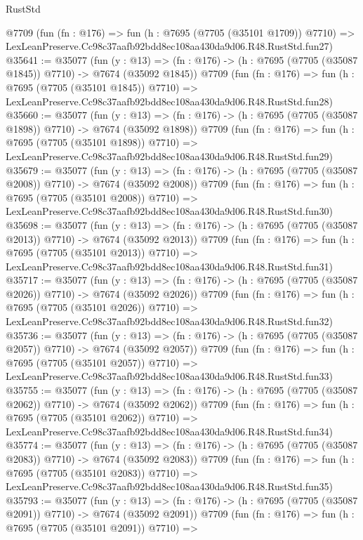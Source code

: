 \begin{lexlean}{RustStd}
\begin{coremodule}
    @7709
    (fun (fn : @176) =>
    fun (h : @7695 (@7705 (@35101 @1709)) @7710) =>
    LexLeanPreserve.Cc98c37aafb92bdd8ec108aa430da9d06.R48.RustStd.fun27)
@35641 := @35077
    (fun (y : @13) =>
    (fn : @176) -> (h : @7695 (@7705 (@35087 @1845)) @7710) -> @7674 (@35092 @1845))
    @7709
    (fun (fn : @176) =>
    fun (h : @7695 (@7705 (@35101 @1845)) @7710) =>
    LexLeanPreserve.Cc98c37aafb92bdd8ec108aa430da9d06.R48.RustStd.fun28)
@35660 := @35077
    (fun (y : @13) =>
    (fn : @176) -> (h : @7695 (@7705 (@35087 @1898)) @7710) -> @7674 (@35092 @1898))
    @7709
    (fun (fn : @176) =>
    fun (h : @7695 (@7705 (@35101 @1898)) @7710) =>
    LexLeanPreserve.Cc98c37aafb92bdd8ec108aa430da9d06.R48.RustStd.fun29)
@35679 := @35077
    (fun (y : @13) =>
    (fn : @176) -> (h : @7695 (@7705 (@35087 @2008)) @7710) -> @7674 (@35092 @2008))
    @7709
    (fun (fn : @176) =>
    fun (h : @7695 (@7705 (@35101 @2008)) @7710) =>
    LexLeanPreserve.Cc98c37aafb92bdd8ec108aa430da9d06.R48.RustStd.fun30)
@35698 := @35077
    (fun (y : @13) =>
    (fn : @176) -> (h : @7695 (@7705 (@35087 @2013)) @7710) -> @7674 (@35092 @2013))
    @7709
    (fun (fn : @176) =>
    fun (h : @7695 (@7705 (@35101 @2013)) @7710) =>
    LexLeanPreserve.Cc98c37aafb92bdd8ec108aa430da9d06.R48.RustStd.fun31)
@35717 := @35077
    (fun (y : @13) =>
    (fn : @176) -> (h : @7695 (@7705 (@35087 @2026)) @7710) -> @7674 (@35092 @2026))
    @7709
    (fun (fn : @176) =>
    fun (h : @7695 (@7705 (@35101 @2026)) @7710) =>
    LexLeanPreserve.Cc98c37aafb92bdd8ec108aa430da9d06.R48.RustStd.fun32)
@35736 := @35077
    (fun (y : @13) =>
    (fn : @176) -> (h : @7695 (@7705 (@35087 @2057)) @7710) -> @7674 (@35092 @2057))
    @7709
    (fun (fn : @176) =>
    fun (h : @7695 (@7705 (@35101 @2057)) @7710) =>
    LexLeanPreserve.Cc98c37aafb92bdd8ec108aa430da9d06.R48.RustStd.fun33)
@35755 := @35077
    (fun (y : @13) =>
    (fn : @176) -> (h : @7695 (@7705 (@35087 @2062)) @7710) -> @7674 (@35092 @2062))
    @7709
    (fun (fn : @176) =>
    fun (h : @7695 (@7705 (@35101 @2062)) @7710) =>
    LexLeanPreserve.Cc98c37aafb92bdd8ec108aa430da9d06.R48.RustStd.fun34)
@35774 := @35077
    (fun (y : @13) =>
    (fn : @176) -> (h : @7695 (@7705 (@35087 @2083)) @7710) -> @7674 (@35092 @2083))
    @7709
    (fun (fn : @176) =>
    fun (h : @7695 (@7705 (@35101 @2083)) @7710) =>
    LexLeanPreserve.Cc98c37aafb92bdd8ec108aa430da9d06.R48.RustStd.fun35)
@35793 := @35077
    (fun (y : @13) =>
    (fn : @176) -> (h : @7695 (@7705 (@35087 @2091)) @7710) -> @7674 (@35092 @2091))
    @7709
    (fun (fn : @176) =>
    fun (h : @7695 (@7705 (@35101 @2091)) @7710) =>

\end{coremodule}
\end{lexlean}
